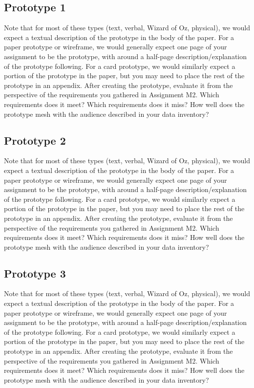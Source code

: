 \subsection{Prototype 1}
Note that for most of these types (text, verbal, Wizard of Oz, physical), we would expect a textual description of the prototype in the body of the paper. For a paper prototype or wireframe, we would generally expect one page of your assignment to be the prototype, with around a half-page description/explanation of the prototype following. For a card prototype, we would similarly expect a portion of the prototype in the paper, but you may need to place the rest of the prototype in an appendix.
After creating the prototype, evaluate it from the perspective of the requirements you gathered in Assignment M2. Which requirements does it meet? Which requirements does it miss? How well does the prototype mesh with the audience described in your data inventory?


\subsection{Prototype 2}
Note that for most of these types (text, verbal, Wizard of Oz, physical), we would expect a textual description of the prototype in the body of the paper. For a paper prototype or wireframe, we would generally expect one page of your assignment to be the prototype, with around a half-page description/explanation of the prototype following. For a card prototype, we would similarly expect a portion of the prototype in the paper, but you may need to place the rest of the prototype in an appendix.
After creating the prototype, evaluate it from the perspective of the requirements you gathered in Assignment M2. Which requirements does it meet? Which requirements does it miss? How well does the prototype mesh with the audience described in your data inventory?


\subsection{Prototype 3}
Note that for most of these types (text, verbal, Wizard of Oz, physical), we would expect a textual description of the prototype in the body of the paper. For a paper prototype or wireframe, we would generally expect one page of your assignment to be the prototype, with around a half-page description/explanation of the prototype following. For a card prototype, we would similarly expect a portion of the prototype in the paper, but you may need to place the rest of the prototype in an appendix.
After creating the prototype, evaluate it from the perspective of the requirements you gathered in Assignment M2. Which requirements does it meet? Which requirements does it miss? How well does the prototype mesh with the audience described in your data inventory?


